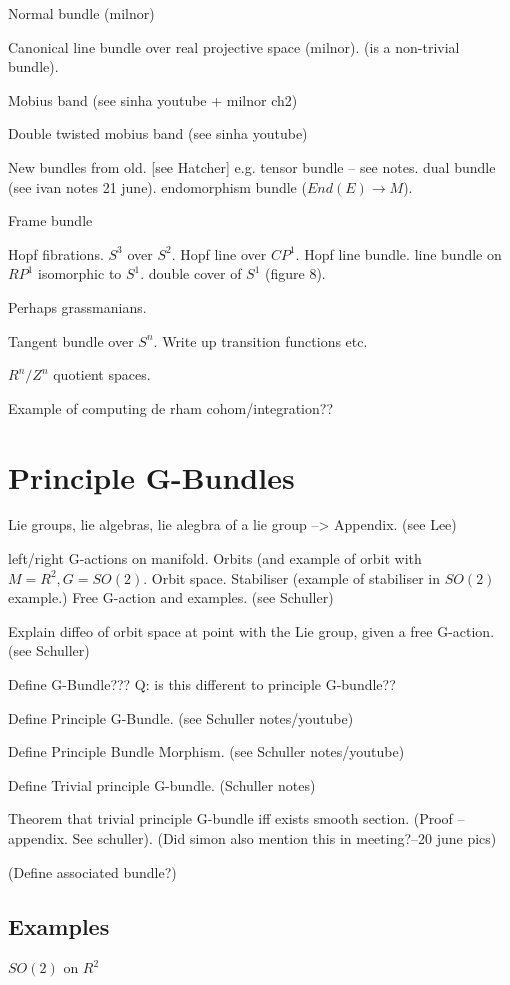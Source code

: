 \documentclass[a4paper]{article}
\theoremstyle{definition} \newtheorem*{definition}{Definition}
\theoremstyle{definition} \newtheorem*{definitions}{Definitions}
\theoremstyle{plain} \newtheorem{theorem}{Theorem}[section]
\theoremstyle{plain} \newtheorem{proposition}[theorem]{Proposition}
\theoremstyle{plain} \newtheorem{corollary}[theorem]{Corollary}
\theoremstyle{plain} \newtheorem{lemma}[theorem]{Lemma}
\theoremstyle{plain} \newtheorem{example}[theorem]{Example}
\begin{document}
Normal bundle (milnor)

Canonical line bundle over real projective space (milnor). (is a non-trivial bundle).

Mobius band (see sinha youtube + milnor ch2)

Double twisted mobius band (see sinha youtube)

New bundles from old. [see Hatcher]
e.g. tensor bundle -- see notes.
dual bundle (see ivan notes 21 june).
endomorphism bundle ($End(E)\to M$).

Frame bundle

Hopf fibrations. $S^3$ over $S^2$. Hopf line over $CP^1$. Hopf line bundle. line bundle on $RP^1$ isomorphic to $S^1$. double cover of $S^1$ (figure 8). 

Perhaps grassmanians.

Tangent bundle over $S^n$. Write up transition functions etc.

$R^n/Z^n$ quotient spaces. 

Example of computing de rham cohom/integration??

\section{Principle G-Bundles}

Lie groups, lie algebras, lie alegbra of a lie group --> Appendix. (see Lee)

left/right G-actions on manifold. Orbits (and example of orbit with $M=R^2, G=SO(2)$. Orbit space. Stabiliser (example of stabiliser in $SO(2)$ example.)
Free G-action and examples. (see Schuller)

Explain diffeo of orbit space at point with the Lie group, given a free G-action. (see Schuller)

Define G-Bundle??? Q: is this different to principle G-bundle??

Define Principle G-Bundle. (see Schuller notes/youtube)

Define Principle Bundle Morphism. (see Schuller notes/youtube)

Define Trivial principle G-bundle. (Schuller notes)

Theorem that trivial principle G-bundle iff exists smooth section. (Proof -- appendix. See schuller).  (Did simon also mention this in meeting?--20 june pics)

(Define associated bundle?)

\subsection{Examples}
$SO(2)$ on $R^2$
\end{document}

